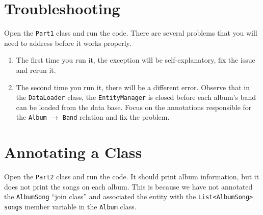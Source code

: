 \documentclass[12pt]{scrartcl}
\begin{document}
\section*{Troubleshooting}

Open the \texttt{Part1} class and run the code.  There are several
problems that you will need to address before it works properly.

\begin{enumerate}
  \item The first time you run it, the exception will be self-explanatory, 
  	fix the issue and rerun it.
  \item The second time you run it, there will be a different error.  Observe
  	that in the \texttt{DataLoader} class, the \texttt{EntityManager}
	is closed before each album's band can be loaded from the data base.  Focus
	on the annotations responsible for the \texttt{Album} $\rightarrow$ 
	\texttt{Band} relation and fix the problem.
\end{enumerate}

\section*{Annotating a Class}

Open the \texttt{Part2} class and run the code.  It should print
album information, but it does not print the songs on each album.  This is
because we have not annotated the \texttt{AlbumSong} ``join class''
and associated the entity with the \texttt{List<AlbumSong> songs}
member variable in the \texttt{Album} class.
\end{document}
